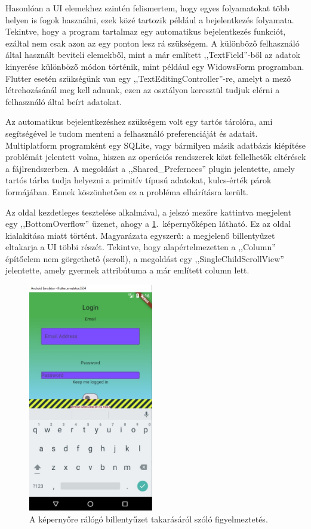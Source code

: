 \documentclass{thesis-ekf}
\theoremstyle{definition}
\theoremstyle{remark}
\begin{document}
	Hasonlóan a UI elemekhez szintén felismertem, hogy egyes folyamatokat több helyen is fogok használni, ezek közé tartozik például a bejelentkezés folyamata. Tekintve, hogy a program tartalmaz egy automatikus bejelentkezés funkciót, ezáltal nem csak azon az egy ponton lesz rá szükségem.
	A különböző felhasználó által használt beviteli elemekből, mint a már említett ,,TextField''-ből az adatok kinyerése különböző módon történik, mint például egy WidowsForm programban. Flutter esetén szükségünk van egy ,,TextEditingController''-re, amelyt a mező létrehozásánál meg kell adnunk, ezen az osztályon keresztül tudjuk elérni a felhasználó által beírt adatokat.
	
	Az automatikus bejelentkezéshez szükségem volt egy tartós tárolóra, ami segítségével le tudom menteni a felhasználó preferenciáját és adatait. Multiplatform programként egy SQLite, vagy bármilyen másik adatbázis kiépítése problémát jelentett volna, hiszen az operációs rendszerek közt fellelhetők eltérések a fájlrendszerben. A megoldást a ,,Shared\_Prefernces'' plugin \cite{bib_flutter_shared_prefs} jelentette, amely tartós tárba tudja helyezni a primitív típusú adatokat, kulcs-érték párok formájában. Ennek köszönhetően ez a probléma elhárításra került.
	
	Az oldal kezdetleges tesztelése alkalmával, a jelszó mezőre kattintva megjelent egy ,,BottomOverflow'' üzenet, ahogy a \ref{img_login}.~képernyőképen látható. Ez az oldal kialakítása miatt történt. Magyarázata egyszerű: a megjelenő billentyűzet eltakarja a UI többi részét. Tekintve, hogy alapértelmezetten a ,,Column'' építőelem nem görgethető (scroll), a megoldást egy ,,SingleChildScrollView'' jelentette, amely gyermek attribútuma a már említett column lett.
	\begin{figure}[!ht]
		\centering
		\includegraphics[height=10cm]{flutter_overflow}
		\caption{A képernyőre rálógó billentyűzet takarásáról szóló figyelmeztetés.}
		\label{img_login}
	\end{figure}
	
\end{document}
